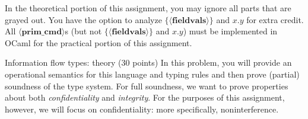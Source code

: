 \documentclass[11pt]{article}
\begin{document}
In the theoretical portion of this assignment, you may ignore all parts that are grayed out. You have the option to analyze $\{\langle\mathbf{fieldvals}\rangle\}$ and $x.y$ for extra credit. {\color{red} All $\langle \mathbf{prim\_cmd} \rangle$s (but not $\{\langle\mathbf{fieldvals}\rangle\}$ and $x.y$) must be implemented in OCaml for the practical portion of this assignment.}

\begin{problem}{Information flow types: theory (30 points)}
In this problem, you will provide an operational semantics for this language and typing rules and then prove (partial) soundness of the type system. For full soundness, we want to prove properties about both \emph{confidentiality} and \emph{integrity}. For the purposes of this assignment, however, we will focus on confidentiality: more specifically, noninterference.


\end{problem}
\end{document}

